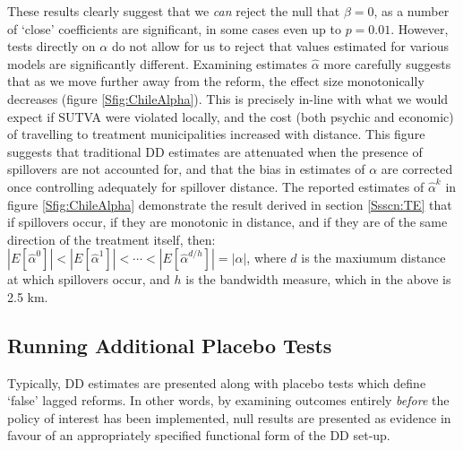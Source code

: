 These results clearly suggest that we \emph{can} reject the null that $\beta=0$, 
as a number of `close' coefficients are significant, in some cases even up to 
$p=0.01$.  However, tests directly on $\alpha$ do not allow for us to reject that 
values estimated for various models are significantly different.  Examining 
estimates $\hat\alpha$ more carefully suggests that as we move further away from 
the reform, the effect size monotonically decreases (figure 
\ref{Sfig:ChileAlpha}).  This is precisely in-line with what we would expect if 
SUTVA were violated locally, and the cost (both psychic and economic) of 
travelling to treatment municipalities increased with distance.  This figure
suggests that traditional DD estimates are attenuated when the presence of 
spillovers are not accounted for, and that the bias in estimates of $\alpha$ are
corrected once controlling adequately for spillover distance.  The reported
estimates of $\hat\alpha^k$ in figure \ref{Sfig:ChileAlpha} demonstrate the
result derived in section \ref{Ssscn:TE} that if spillovers occur, if they
are monotonic in distance, and if they are of the same direction of the treatment
itself, then:
$|E[\hat\alpha^0]|<|E[\hat\alpha^1]|<\cdots<|E[\hat\alpha^{d/h}]|=|\alpha|$,
where $d$ is the maxiumum distance at which spillovers occur, and $h$ is the
bandwidth measure, which in the above is 2.5 km.

\subsection{Running Additional Placebo Tests}
Typically, DD estimates are presented along with placebo tests which define 
`false' lagged reforms.  In other words, by examining outcomes entirely 
\emph{before} the policy of interest has been implemented, null results are 
presented as evidence in favour of an appropriately specified functional form of 
the DD set-up.

